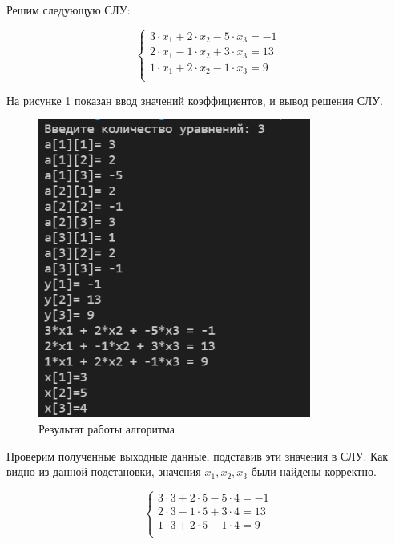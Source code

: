 \documentclass[bachelor, och, labwork]{shiza}
\begin{document}
  Решим следующую СЛУ:
  
  \begin{equation*}
    \begin{cases}
      3 \cdot x_1 + 2 \cdot x_2 - 5 \cdot x_3 = -1 \\
      2 \cdot x_1 - 1 \cdot x_2 + 3 \cdot x_3 = 13 \\
      1 \cdot x_1 + 2 \cdot x_2 - 1 \cdot x_3 = 9 \\
    \end{cases}
  \end{equation*}
  
  На рисунке 1 показан ввод значений коэффициентов, и вывод решения СЛУ.
  
  \begin{figure}[H]
    \centering
    \includegraphics[width=0.8\textwidth]{img/3-1}
    \caption{Результат работы алгоритма}
  \end{figure}

  Проверим полученные выходные данные, подставив эти значения в СЛУ. Как видно из данной подстановки,
  значения $x_1, x_2, x_3$ были найдены корректно. 

  \begin{equation*}
    \begin{cases}
      3 \cdot 3 + 2 \cdot 5 - 5 \cdot 4 = -1 \\
      2 \cdot 3 - 1 \cdot 5 + 3 \cdot 4 = 13 \\
      1 \cdot 3 + 2 \cdot 5 - 1 \cdot 4 = 9 \\
    \end{cases}
  \end{equation*}
  
\end{document}
